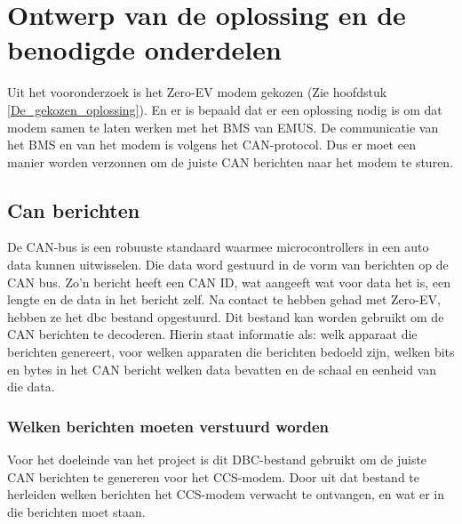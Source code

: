\chapter{Ontwerp van de oplossing en de benodigde onderdelen}
\label{Ontwerp_van_de_oplossing_en_de_benodigde_onderdelen}

Uit het vooronderzoek is het Zero-EV modem gekozen (Zie hoofdstuk
\ref{De_gekozen_oplossing}). En er is bepaald dat er een oplossing nodig is om
dat modem samen te laten werken met het BMS van EMUS. De communicatie van het
BMS en van het modem is volgens het CAN-protocol. Dus er moet een manier worden
verzonnen om de juiste CAN berichten naar het modem te sturen.

\section{Can berichten}

De CAN-bus is een robuuste standaard waarmee microcontrollers in een auto data
kunnen uitwisselen. Die data word gestuurd in de vorm van berichten op de CAN
bus. Zo'n bericht heeft een CAN ID, wat aangeeft wat voor data het is, een
lengte en de data in het bericht zelf. Na contact te hebben gehad met Zero-EV,
hebben ze het \ac{dbc} bestand opgestuurd. Dit bestand kan worden gebruikt om
de CAN berichten te decoderen. Hierin staat informatie als: welk apparaat die
berichten genereert, voor welken apparaten die berichten bedoeld zijn, welken
bits en bytes in het CAN bericht welken data bevatten en de schaal en eenheid
van die data. \cite{DBC_File_Database_Intro}

\subsection{Welken berichten moeten verstuurd worden}

Voor het doeleinde van het project is dit DBC-bestand gebruikt om de juiste CAN
berichten te genereren voor het CCS-modem. Door uit dat bestand te herleiden
welken berichten het CCS-modem verwacht te ontvangen, en wat er in die
berichten moet staan.

